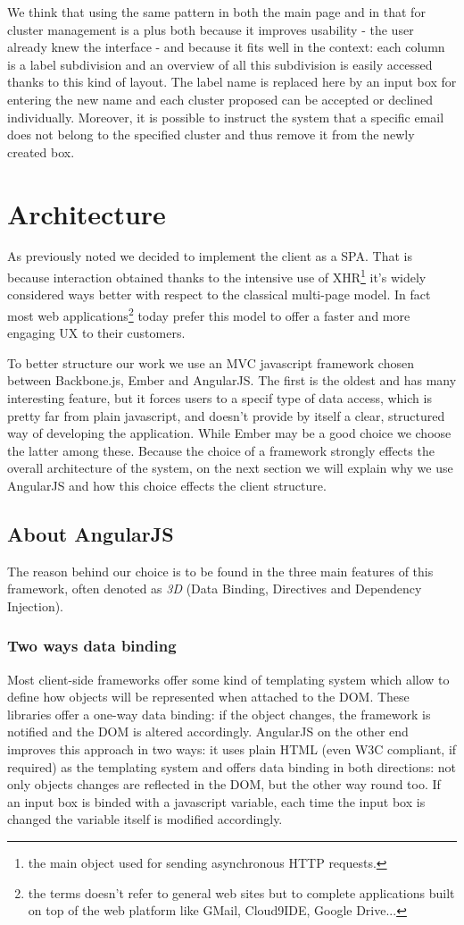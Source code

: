 \documentclass[a4paper,12pt]{report}
\begin{document}
We think that using the same pattern in both the main page and in that for cluster management is a plus both because it improves usability - the user already knew the interface - and because it fits well in the context: each column is a label subdivision and an overview of all this subdivision is easily accessed thanks to this kind of layout. The label name is replaced here by an input box for entering the new name and each cluster proposed can be accepted or declined individually.
Moreover, it is possible to instruct the system that a specific email does not belong to the specified cluster and thus remove it from the newly created box.

\section{Architecture}
As previously noted we decided to implement the client as a SPA. That is because interaction obtained thanks to the intensive use of XHR\footnote{the main object used for sending asynchronous HTTP requests.} it's widely considered ways better with respect to the classical multi-page model. In fact most web applications\footnote{the terms doesn't refer to general web sites but to complete applications built on top of the web platform like GMail, Cloud9IDE, Google Drive...} today prefer this model to offer a faster and more engaging UX to their customers. 

To better structure our work we use an MVC javascript framework chosen between Backbone.js, Ember and AngularJS. The first is the oldest and has many interesting feature, but it forces users to a specif type of data access, which is pretty far from plain javascript, and doesn't provide by itself a clear, structured way of developing the application. While Ember may be a good choice we choose the latter among these.
Because the choice of a framework strongly effects the overall architecture of the system, on the next section we will explain why we use AngularJS and how this choice effects the client structure.
\subsection{About AngularJS}
The reason behind our choice is to be found in the three main features of this framework, often denoted as \emph{3D} (Data Binding, Directives and Dependency Injection).
\subsubsection{Two ways data binding}
Most client-side frameworks offer some kind of templating system which allow to define how objects will be represented when attached to the DOM. These libraries offer a one-way data binding: if the object changes, the framework is notified and the DOM is altered accordingly.
AngularJS on the other end improves this approach in two ways: it uses plain HTML (even W3C compliant, if required) as the templating system and offers data binding in both directions: not only objects changes are reflected in the DOM, but the other way round too. If an input box is binded with a javascript variable, each time the input box is changed the variable itself is modified accordingly.
\end{document}
